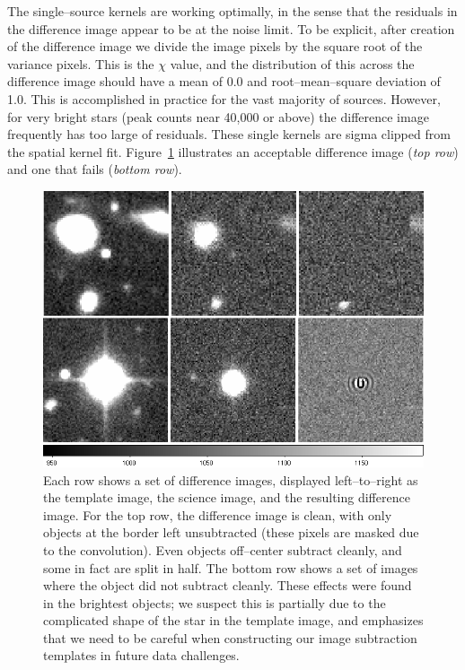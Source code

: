 The single--source kernels are working optimally, in the sense that
the residuals in the difference image appear to be at the noise limit.
To be explicit, after creation of the difference image we divide the
image pixels by the square root of the variance pixels.  This is the
$\chi$ value, and the distribution of this across the difference image
should have a mean of 0.0 and root--mean--square deviation of 1.0.
This is accomplished in practice for the vast majority of sources.
However, for very bright stars (peak counts near 40,000 or above) the
difference image frequently has too large of residuals.  These single
kernels are sigma clipped from the spatial kernel fit.
Figure~\ref{fig:diffim} illustrates an acceptable difference image
({\it top row}) and one that fails ({\it bottom row}).  

\begin{figure}[htp]
\centering
\includegraphics[width=6in]{images/diffim.png}
\caption[Example difference images.]
{ Each row shows a set of difference images, displayed left--to--right
as the template image, the science image, and the resulting difference
image.  For the top row, the difference image is clean, with only
objects at the border left unsubtracted (these pixels are masked due
to the convolution).  Even objects off--center subtract cleanly, and
some in fact are split in half.  The bottom row shows a set of images
where the object did not subtract cleanly.  These effects were found
in the brightest objects; we suspect this is partially due to the
complicated shape of the star in the template image, and emphasizes
that we need to be careful when constructing our image subtraction
templates in future data challenges.  }
\label{fig:diffim}
\end{figure}

